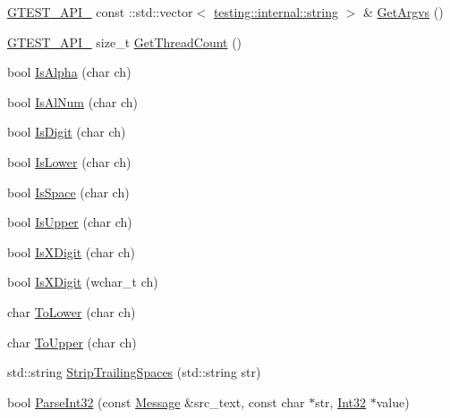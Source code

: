 \begin{DoxyCompactItemize}
\item 
\hyperlink{gtest-port_8h_aa73be6f0ba4a7456180a94904ce17790}{G\+T\+E\+S\+T\+\_\+\+A\+P\+I\+\_\+} const \+::std\+::vector$<$ \hyperlink{namespacetesting_1_1internal_a8e8ff5b11e64078831112677156cb111}{testing\+::internal\+::string} $>$ \& \hyperlink{namespacetesting_1_1internal_a344160f771a3b754fa4e54b6e9846b23}{Get\+Argvs} ()
\item 
\hyperlink{gtest-port_8h_aa73be6f0ba4a7456180a94904ce17790}{G\+T\+E\+S\+T\+\_\+\+A\+P\+I\+\_\+} size\+\_\+t \hyperlink{namespacetesting_1_1internal_a3b9b3649cd04558bf46c75de52a7ef34}{Get\+Thread\+Count} ()
\item 
bool \hyperlink{namespacetesting_1_1internal_aeb957087fd6bbf9db98ab7cd41b0c129}{Is\+Alpha} (char ch)
\item 
bool \hyperlink{namespacetesting_1_1internal_a83802e7f23324cd512232203662e1a98}{Is\+Al\+Num} (char ch)
\item 
bool \hyperlink{namespacetesting_1_1internal_a4bd96b7fa6486802d33ddc217af55a39}{Is\+Digit} (char ch)
\item 
bool \hyperlink{namespacetesting_1_1internal_ac26ce3883bc8919c27074975e958f3b7}{Is\+Lower} (char ch)
\item 
bool \hyperlink{namespacetesting_1_1internal_af429e04f70f9c10f6aa76a5d1ccd389f}{Is\+Space} (char ch)
\item 
bool \hyperlink{namespacetesting_1_1internal_a84f3baa379fec6bf5947cb5165aa8cc9}{Is\+Upper} (char ch)
\item 
bool \hyperlink{namespacetesting_1_1internal_aa234ef141278263fb143b616c74c86e7}{Is\+X\+Digit} (char ch)
\item 
bool \hyperlink{namespacetesting_1_1internal_a6ab68a30f8291c09b2289c132bbe3b16}{Is\+X\+Digit} (wchar\+\_\+t ch)
\item 
char \hyperlink{namespacetesting_1_1internal_ad9c627ef2a94245e3fd69e7ab3d49b42}{To\+Lower} (char ch)
\item 
char \hyperlink{namespacetesting_1_1internal_ac1b876a8133895bd553d4780ecaa1e3a}{To\+Upper} (char ch)
\item 
std\+::string \hyperlink{namespacetesting_1_1internal_aa6afda12e567c353e2e9b9c2e8cae14f}{Strip\+Trailing\+Spaces} (std\+::string str)
\item 
bool \hyperlink{namespacetesting_1_1internal_ac06fc81336a3d80755f4020d34321766}{Parse\+Int32} (const \hyperlink{classtesting_1_1_message}{Message} \&src\+\_\+text, const char $\ast$str, \hyperlink{namespacetesting_1_1internal_a8ee38faaf875f133358abaf9bc056cec}{Int32} $\ast$value)

\end{DoxyCompactItemize}
